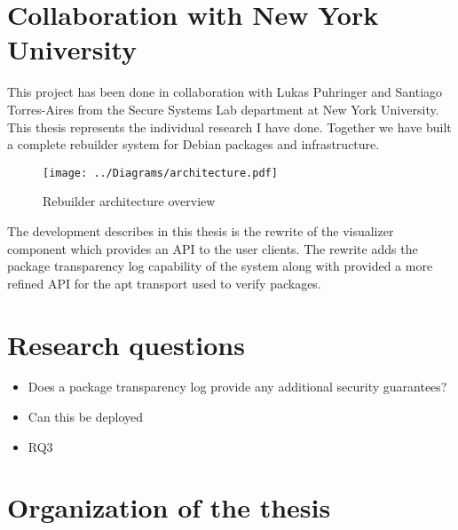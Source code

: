 \documentclass[../Main/thesis.tex]{subfiles}
\begin{document}
\section{Collaboration with New York University}\label{sec:collab}
This project has been done in collaboration with Lukas Puhringer and Santiago
Torres-Aires from the Secure Systems Lab department at New York University. This
thesis represents the individual research I have done. Together we have built a
complete rebuilder system for Debian packages and infrastructure. 

\begin{figure}[H]
\centering
\texttt{[image: ../Diagrams/architecture.pdf]}
\caption{Rebuilder architecture overview}
\label{fig:rebuilder_architecture}
\end{figure}

The development describes in this thesis is the rewrite of the visualizer
component which provides an API to the user clients. The rewrite adds the
package transparency log capability of the system along with provided a more
refined API for the apt transport used to verify packages.

\section{Research questions}\label{sec:rq}
\begin{itemize}
    \item Does a package transparency log provide any additional security guarantees?
    \item Can this be deployed
    \item RQ3
\end{itemize}

\section{Organization of the thesis}\label{sec:organization}

\blankpage
\end{document}
